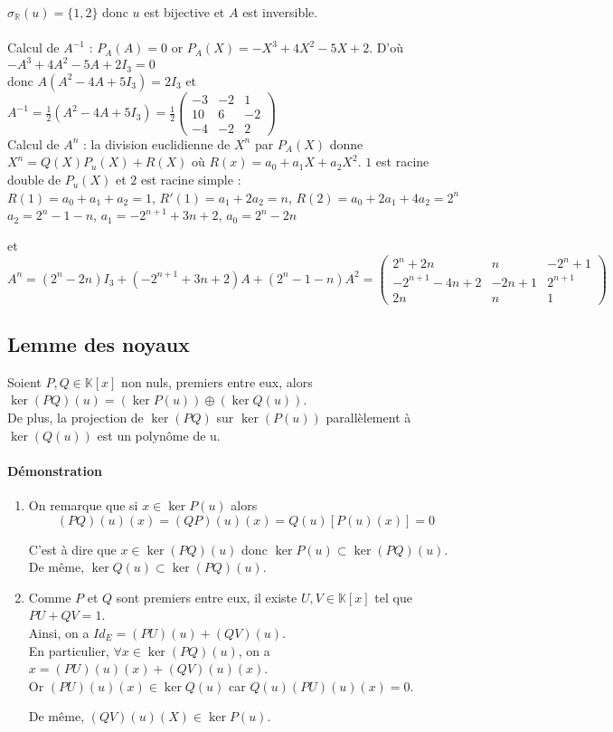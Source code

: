 \documentclass[a4paper,10pt]{book} %
\newcommand{\R}{\mathbb{R}}
\newcommand{\K}{\mathbb{K}}
\begin{document}
$\sigma_\R(u)=\{1,2\}$ donc $u$ est bijective et $A$ est inversible.\\\\

Calcul de $A^{-1}$ :
$P_A(A)=0$ or $P_A(X)=-X^3+4X^2-5X+2$.
D'où $-A^3+4A^2-5A+2I_3=0$\\donc $A(A^2-4A+5I_3)=2I_3$
et $A^{-1}=\frac{1}{2}(A^2-4A+5I_3)= \frac{1}{2}\begin{pmatrix}
-3&-2&1\\10&6&-2\\-4&-2&2
\end{pmatrix}$\\

Calcul de $A^n$ :
la division euclidienne de $X^n$ par $P_A(X)$ donne $X^n=Q(X)P_u(X)+R(X)$ où $R(x)=a_0+a_1X+a_2X^2$.
$1$ est racine double de $P_u(X)$ et $2$ est racine simple :\\
$R(1)=a_0+a_1+a_2=1$, $R'(1)=a_1+2a_2=n$, $R(2)=a_0+2a_1+4a_2=2^n$\\

$a_2=2^n-1-n$, $a_1=-2^{n+1}+3n+2$, $a_0=2^n-2n$

et $A^n=(2^n-2n)I_3+(-2^{n+1}+3n+2)A+(2^n-1-n)A^2=\begin{pmatrix}
2^n+2n&n&-2^n+1\\-2^{n+1}-4n+2&-2n+1&2^{n+1}\\2n&n&1
\end{pmatrix}$

\subsection{Lemme des noyaux}
Soient $P,Q\in \K[x]$ non nuls, premiers entre eux, alors
$\ker(PQ)(u)=(\ker P(u))\oplus (\ker Q(u))$.\\
De plus, la projection de $\ker (PQ)$ sur $\ker (P(u))$ parallèlement à $\ker (Q(u))$ est un polynôme de u.

\paragraph{Démonstration}
\begin{enumerate}
\item On remarque que si $x\in \ker P(u)$ alors
$$(PQ)(u)(x)=(QP)(u)(x)=Q(u)[P(u)(x)]=0$$

C'est à dire que $x\in \ker (PQ)(u)$ donc $\ker P(u)\subset \ker (PQ)(u)$.\\
De même, $\ker Q(u)\subset \ker (PQ)(u)$.\\

\item Comme $P$ et $Q$ sont premiers entre eux, il existe $U,V \in \K[x]$ tel que $PU+QV=1$.\\

Ainsi, on a $Id_E=(PU)(u)+(QV)(u)$.\\
En particulier, $\forall x\in \ker (PQ)(u)$, on a $x=(PU)(u)(x)+(QV)(u)(x)$.\\

Or $(PU)(u)(x)\in \ker Q(u)$ car $Q(u)(PU)(u)(x)=0$.

De même, $(QV)(u)(X) \in \ker P(u)$.
\end{enumerate}
\end{document}
